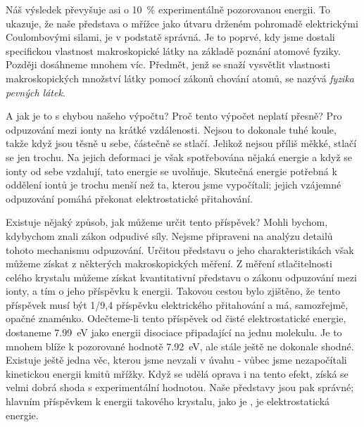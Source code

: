     Náš výsledek převyšuje asi o \SI{10}{\percent} experimentálně pozorovanou energii. To ukazuje,
    že naše představa o mřížce jako útvaru drženém pohromadě elektrickými Coulombovými silami, je v
    podstatě správná. Je to poprvé, kdy jsme dostali specifickou vlastnost makroskopické látky na
    základě poznání atomové fyziky. Později dosáhneme mnohem víc. Předmět, jenž se snaží vysvětlit
    vlastnosti makroskopických množství látky pomocí zákonů chování atomů, se nazývá \emph{fyzika
    pevných látek}.

    A jak je to s chybou našeho výpočtu? Proč tento výpočet neplatí přesně? Pro odpuzování mezi
    ionty na krátké vzdálenosti. Nejsou to dokonale tuhé koule, takže když jsou těsně u sebe,
    částečně se stlačí. Jelikož nejsou příliš měkké, stlačí se jen trochu. Na jejich deformaci je
    však spotřebována nějaká energie a když se ionty od sebe vzdalují, tato energie se uvolňuje.
    Skutečná energie potřebná k oddělení iontů je trochu menší než ta, kterou jsme vypočítali;
    jejich vzájemné odpuzování pomáhá překonat elektrostatické přitahování.

    Existuje nějaký způsob, jak můžeme určit tento příspěvek? Mohli bychom, kdybychom znali zákon
    odpudivé síly. Nejsme připraveni na analýzu detailů tohoto mechanismu odpuzování. Určitou
    představu o jeho charakteristikách však můžeme získat z některých makroskopických měření. Z
    měření stlačitelnosti celého krystalu můžeme získat kvantitativní představu o zákonu odpuzování
    mezi ionty, a tím o jeho příspěvku k energii. Takovou cestou bylo zjištěno, že tento příspěvek
    musí být 1/9,4 příspěvku elektrického přitahování a má, samozřejmě, opačné znaménko. Odečteme-li
    tento příspěvek od čisté elektrostatické energie, dostaneme \SI{7.99}{\electronvolt} jako
    energii disociace připadající na jednu molekulu. Je to mnohem blíže k pozorované hodnotě
    \SI{7.92}{\electronvolt}, ale stále ještě ne dokonale shodné. Existuje ještě jedna věc, kterou
    jsme nevzali v úvahu - vůbec jsme nezapočítali kinetickou energii kmitů mřížky. Když se udělá
    oprava i na tento efekt, získá se velmi dobrá shoda s experimentální hodnotou. Naše představy
    jsou pak správné; hlavním příspěvkem k energii takového krystalu, jako je , je
    elektrostatická energie.


